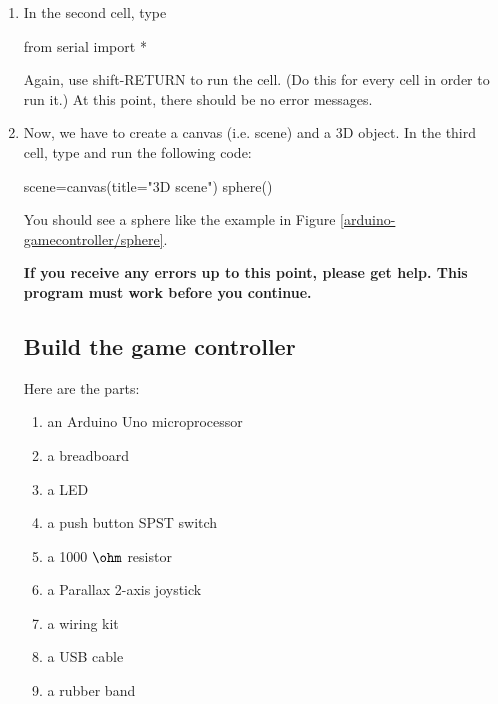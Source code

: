 \begin{enumerate}
{\bf Use shift-RETURN to run the code in the cell.}

After running, the cell will receive the number 1 and will be labeled . The numbering system shows you the sequence that cells were run.

\item In the second cell, type

\begin{myvpython}
from serial import *
\end{myvpython}

Again, use shift-RETURN to run the cell. (Do this for every cell in order to run it.) At this point, there should be no error messages.

\item Now, we have to create a canvas (i.e. scene) and a 3D object. In the third cell, type and run the following code:

\begin{myvpython}
scene=canvas(title="3D scene")
sphere()
\end{myvpython}

You should see a sphere like the example in Figure \ref{arduino-gamecontroller/sphere}.


{\bf If you receive any errors up to this point, please get help. This program must work before you continue.}

\subsection*{Build the game controller}

Here are the parts:

\begin{enumerate}
	\item an Arduino Uno microprocessor
	\item a breadboard
	\item a LED
	\item a push button SPST switch
	\item a 1000 $\ohm$ resistor
	\item a Parallax 2-axis joystick
	\item a wiring kit
	\item a USB cable
	\item a rubber band
\end{enumerate}


\end{enumerate}
